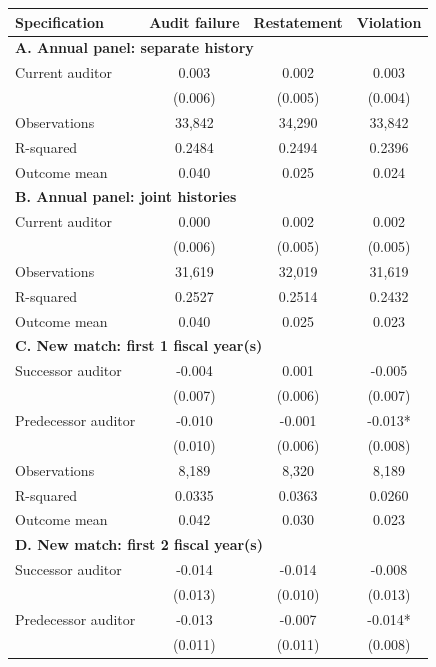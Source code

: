 \documentclass[10pt]{article}
\begin{document}
\begin{minipage}{19cm}\fontsize{10}{12}\selectfont\setlength{\tabcolsep}{4pt}\renewcommand{\arraystretch}{1.12}


\centering
{}
\begin{threeparttable}
\begin{tabular}{p{}ccc}
\toprule
Specification & Audit failure & Restatement & Violation \\
\midrule
\multicolumn{4}{l}{\textbf{A. Annual panel: separate history}} \\
Current auditor & 0.003 & 0.002 & 0.003 \\
 & (0.006) & (0.005) & (0.004) \\
Observations & 33,842 & 34,290 & 33,842 \\
R-squared & 0.2484 & 0.2494 & 0.2396 \\
Outcome mean & 0.040 & 0.025 & 0.024 \\
\multicolumn{4}{l}{\textbf{B. Annual panel: joint histories}} \\
Current auditor & 0.000 & 0.002 & 0.002 \\
 & (0.006) & (0.005) & (0.005) \\
Observations & 31,619 & 32,019 & 31,619 \\
R-squared & 0.2527 & 0.2514 & 0.2432 \\
Outcome mean & 0.040 & 0.025 & 0.023 \\
\multicolumn{4}{l}{\textbf{C. New match: first 1 fiscal year(s)}} \\
Successor auditor & -0.004 & 0.001 & -0.005 \\
 & (0.007) & (0.006) & (0.007) \\
Predecessor auditor & -0.010 & -0.001 & -0.013* \\
 & (0.010) & (0.006) & (0.008) \\
Observations & 8,189 & 8,320 & 8,189 \\
R-squared & 0.0335 & 0.0363 & 0.0260 \\
Outcome mean & 0.042 & 0.030 & 0.023 \\
\multicolumn{4}{l}{\textbf{D. New match: first 2 fiscal year(s)}} \\
Successor auditor & -0.014 & -0.014 & -0.008 \\
 & (0.013) & (0.010) & (0.013) \\
Predecessor auditor & -0.013 & -0.007 & -0.014* \\
 & (0.011) & (0.011) & (0.008) \\

\end{tabular}
\end{threeparttable}
\end{minipage}
\end{document}
